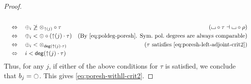 \documentclass[a4paper]{memoir}
\begin{document}
\begin{proof}
\begin{align*}
		\\ &\quad\Leftrightarrow\quad
		\pospol_i \not\geq \mixpol_{\sucdeg(j)} \circ \tau
		& \text{($\loch \circ \tau \dashv \loch \circ \rho$)}
		\\ &\quad\Leftrightarrow\quad
		\pospol_i < \mixpol \circ ({\sucdeg(j)} \cdot \tau)
		& \text{(By \cref{eq:poldeg-poresh}. Sym.\ pol.\ degrees are always comparable)}
		\\ &\quad\Leftrightarrow\quad
		\pospol_i < \mixpol_{\getdeg({\sucdeg(j)} \cdot \tau)}
		& \text{($\tau$ satisfies \cref{eq:poresh-left-adjoint-crit2})}
		\\ &\quad\Leftrightarrow\quad
		i < \getdeg({\sucdeg(j)} \cdot \tau)
	\end{align*}
	Thus, for any $j$, if either of the above conditions for $\tau$ is satisfied, we conclude that $b_j = \npolar$.
	This gives \cref{eq:poresh-withll-crit2}.
\end{proof}

\end{document}
